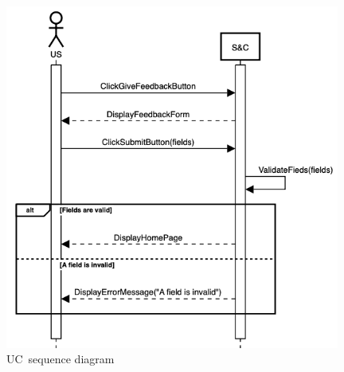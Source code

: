\begin{figure}[h]
    \centering
    \includegraphics[width=11cm]{images/sequence-diagrams/student-fills-out-feedback-form.png}
    \caption{UC\theuc\ sequence diagram}
\end{figure}


